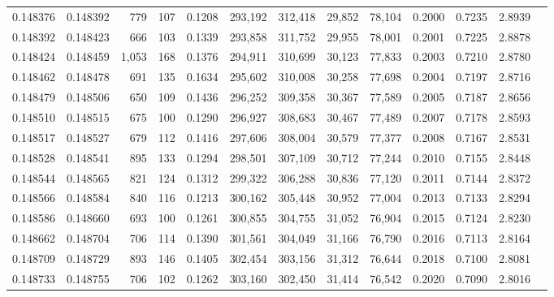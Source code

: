 \begin{tabular}{rrrrrrrrrrrrr}
0.148376 & 0.148392 &   779 & 107 &                                     0.1208 & 293,192 & 312,418 &  29,852 &  78,104 & 0.2000 & 0.7235 & 2.8939 \\
0.148392 & 0.148423 &   666 & 103 &                                     0.1339 & 293,858 & 311,752 &  29,955 &  78,001 & 0.2001 & 0.7225 & 2.8878 \\
0.148424 & 0.148459 & 1,053 & 168 &                                     0.1376 & 294,911 & 310,699 &  30,123 &  77,833 & 0.2003 & 0.7210 & 2.8780 \\
0.148462 & 0.148478 &   691 & 135 &                                     0.1634 & 295,602 & 310,008 &  30,258 &  77,698 & 0.2004 & 0.7197 & 2.8716 \\
0.148479 & 0.148506 &   650 & 109 &                                     0.1436 & 296,252 & 309,358 &  30,367 &  77,589 & 0.2005 & 0.7187 & 2.8656 \\
0.148510 & 0.148515 &   675 & 100 &                                     0.1290 & 296,927 & 308,683 &  30,467 &  77,489 & 0.2007 & 0.7178 & 2.8593 \\
0.148517 & 0.148527 &   679 & 112 &                                     0.1416 & 297,606 & 308,004 &  30,579 &  77,377 & 0.2008 & 0.7167 & 2.8531 \\
0.148528 & 0.148541 &   895 & 133 &                                     0.1294 & 298,501 & 307,109 &  30,712 &  77,244 & 0.2010 & 0.7155 & 2.8448 \\
0.148544 & 0.148565 &   821 & 124 &                                     0.1312 & 299,322 & 306,288 &  30,836 &  77,120 & 0.2011 & 0.7144 & 2.8372 \\
0.148566 & 0.148584 &   840 & 116 &                                     0.1213 & 300,162 & 305,448 &  30,952 &  77,004 & 0.2013 & 0.7133 & 2.8294 \\
0.148586 & 0.148660 &   693 & 100 &                                     0.1261 & 300,855 & 304,755 &  31,052 &  76,904 & 0.2015 & 0.7124 & 2.8230 \\
0.148662 & 0.148704 &   706 & 114 &                                     0.1390 & 301,561 & 304,049 &  31,166 &  76,790 & 0.2016 & 0.7113 & 2.8164 \\
0.148709 & 0.148729 &   893 & 146 &                                     0.1405 & 302,454 & 303,156 &  31,312 &  76,644 & 0.2018 & 0.7100 & 2.8081 \\
0.148733 & 0.148755 &   706 & 102 &                                     0.1262 & 303,160 & 302,450 &  31,414 &  76,542 & 0.2020 & 0.7090 & 2.8016 \\

\end{tabular}
